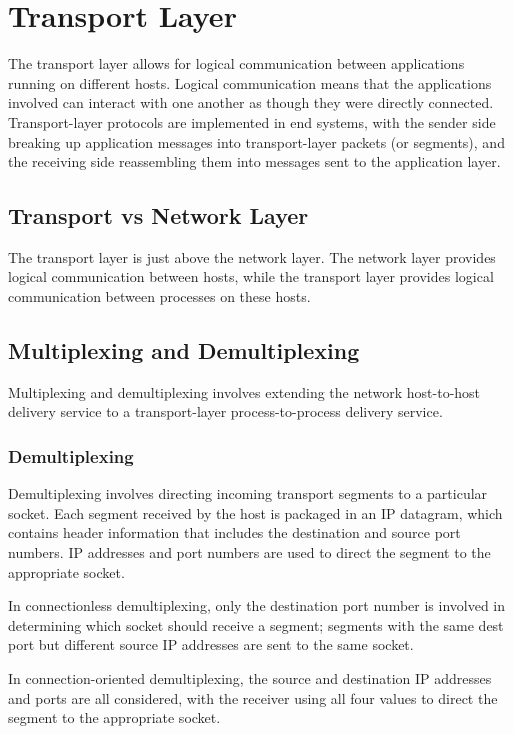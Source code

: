 \documentclass[12pt,titlepage]{article}
\begin{document}
  \newpage

  \section{Transport Layer}
    The transport layer allows for logical communication between applications running on different hosts. Logical communication means that the applications involved can interact with one
    another as though they were directly connected. Transport-layer protocols are implemented in end systems, with the sender side breaking up application messages into transport-layer
    packets (or segments), and the receiving side reassembling them into messages sent to the application layer.

    \subsection{Transport vs Network Layer}
      The transport layer is just above the network layer. The network layer provides logical communication between hosts, while the transport layer provides logical communication between
      processes on these hosts.

    \subsection{Multiplexing and Demultiplexing}
      Multiplexing and demultiplexing involves extending the network host-to-host delivery service to a transport-layer process-to-process delivery service.

      \subsubsection{Demultiplexing}
        Demultiplexing involves directing incoming transport segments to a particular socket. Each segment received by the host is packaged in an IP datagram, which contains header
        information that includes the destination and source port numbers. IP addresses and port numbers are used to direct the segment to the appropriate socket.

        In connectionless demultiplexing, only the destination port number is involved in determining which socket should receive a segment; segments with the same dest port but
        different source IP addresses are sent to the same socket.

        In connection-oriented demultiplexing, the source and destination IP addresses and ports are all considered, with the receiver using all four values to direct the
        segment to the appropriate socket.
\end{document}
